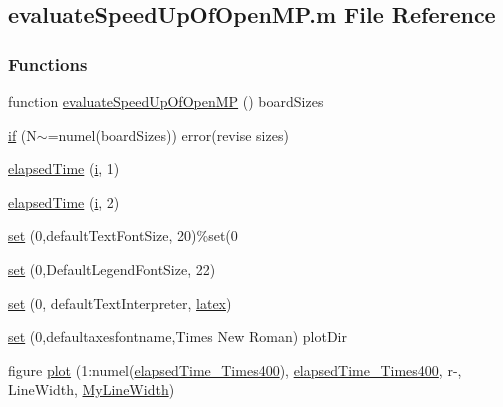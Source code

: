 \hypertarget{a00100}{}\subsection{evaluate\+Speed\+Up\+Of\+Open\+M\+P.\+m File Reference}
\label{a00100}
\subsubsection*{Functions}
\begin{DoxyCompactItemize}
\item 
function \hyperlink{a00100_ae80046205ac111ac13350a8af924023c}{evaluate\+Speed\+Up\+Of\+Open\+M\+P} () board\+Sizes
\item 
\hyperlink{a00100_a7dfde2690fc0e73598d08c98d98b42d9}{if} (N$\sim$=numel(board\+Sizes)) error(\textquotesingle{}revise sizes\textquotesingle{})
\item 
\hyperlink{a00100_a215005d36e08dd694707b52c8287c82c}{elapsed\+Time} (\hyperlink{a00107_a6f6ccfcf58b31cb6412107d9d5281426}{i}, 1)
\item 
\hyperlink{a00100_aa34a8c2af1a2f3a8758e70eafba9d319}{elapsed\+Time} (\hyperlink{a00107_a6f6ccfcf58b31cb6412107d9d5281426}{i}, 2)
\item 
\hyperlink{a00100_a9f5744fcd94781c07dbabae4c710c761}{set} (0,\textquotesingle{}default\+Text\+Font\+Size\textquotesingle{}, 20)\%set(0
\item 
\hyperlink{a00100_a2460df035eb610714a3c3a48c9f03060}{set} (0,\textquotesingle{}Default\+Legend\+Font\+Size\textquotesingle{}, 22)
\item 
\hyperlink{a00100_ac1d3cd781817f4aab3a30fa75caa8eb3}{set} (0, \textquotesingle{}default\+Text\+Interpreter\textquotesingle{}, \textquotesingle{}\hyperlink{a00100_a66e032e6bf106a3a05fb033cce4141a9}{latex}\textquotesingle{})
\item 
\hyperlink{a00100_aea2a22e88db44fc95ff2349666eab45f}{set} (0,\textquotesingle{}defaultaxesfontname\textquotesingle{},\textquotesingle{}Times New Roman\textquotesingle{}) plot\+Dir
\item 
figure \hyperlink{a00100_a4563e54188162a00258468e4c35cd30c}{plot} (1\+:numel(\hyperlink{a00100_a03937bae300a959855cddd0d6d315fc0}{elapsed\+Time\+\_\+Times400}), \hyperlink{a00100_a03937bae300a959855cddd0d6d315fc0}{elapsed\+Time\+\_\+Times400}, \textquotesingle{}r-\/\textquotesingle{}, \textquotesingle{}Line\+Width\textquotesingle{}, \hyperlink{a00100_a76b83ba444571bd585a06a5e6740202e}{My\+Line\+Width})

\end{DoxyCompactItemize}
